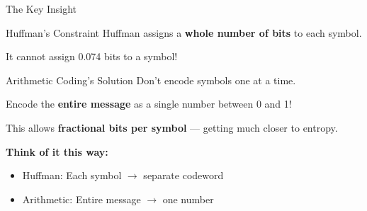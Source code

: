 \documentclass[aspectratio=169,12pt]{beamer}
\begin{document}
\begin{frame}{The Key Insight}
    \begin{alertblock}{Huffman's Constraint}
        Huffman assigns a \textbf{whole number of bits} to each symbol.
        
        It cannot assign 0.074 bits to a symbol!
    \end{alertblock}
    
    \vspace{0.5cm}
    \begin{block}{Arithmetic Coding's Solution}
        Don't encode symbols one at a time.
        
        Encode the \textbf{entire message} as a single number between 0 and 1!
        
        \vspace{0.2cm}
        This allows \textbf{fractional bits per symbol} --- getting much closer to entropy.
    \end{block}
    
    \vspace{0.3cm}
    \textbf{Think of it this way:}
    \begin{itemize}
        \item Huffman: Each symbol $\rightarrow$ separate codeword
        \item Arithmetic: Entire message $\rightarrow$ one number
    \end{itemize}
\end{frame}
\end{document}
